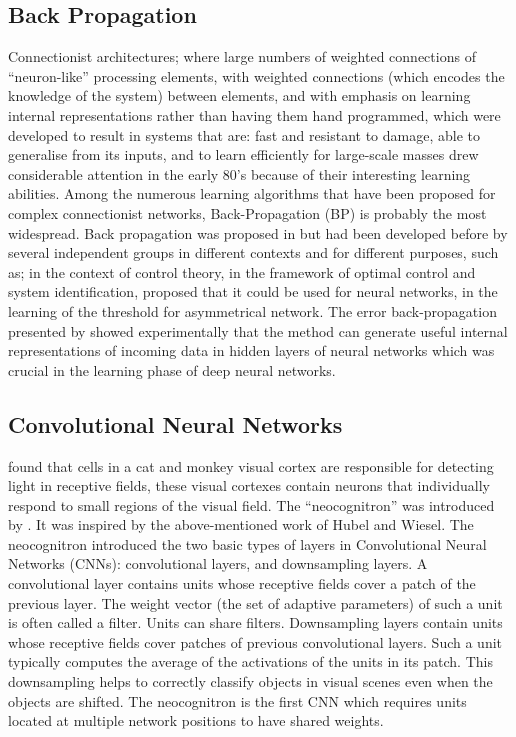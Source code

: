 \documentclass[12pt]{report}
\numberwithin{equation}{section}
\begin{document}
\subsection{Back Propagation}
Connectionist architectures; where large numbers of weighted connections of ``neuron-like'' processing elements, with weighted connections (which encodes the knowledge of the system) between elements, and with emphasis on learning internal representations rather than having them hand programmed, which were developed to result in systems that are: fast and resistant to damage, able to generalise from its inputs, and to learn efficiently for large-scale masses drew considerable attention in the early 80's because of their interesting learning abilities. Among the numerous learning algorithms that have been proposed for complex connectionist networks, Back-Propagation (BP) is probably the most widespread. Back propagation was proposed in {\cite{RumelhartHintonWilliams86}} but had been developed before by several independent groups in different contexts and for different purposes, such as; {\cite{Kelley:1960}} in the context of control theory, {\cite{BrysonHo69}} in the framework of optimal control and system identification, {\cite{Werbos:74}} proposed that it could be used for neural networks, {\cite{7fa6b6a5cde14bcfbd7ab3a8f19d0d56}} in the learning of the threshold for asymmetrical network. The error back-propagation presented by {\cite{RumelhartHintonWilliams86}} showed experimentally that the method can generate useful internal representations of incoming data in hidden layers of neural networks which was crucial in the learning phase of deep neural networks.

\subsection{Convolutional Neural Networks}
{\cite{Hubel:62}} found that cells in a cat and monkey visual cortex are responsible for detecting light in receptive fields, these visual cortexes contain neurons that individually respond to small regions of the visual field. The ``neocognitron'' was introduced by {\cite{fukushima:neocognitronbc}}. It was inspired by the above-mentioned work of Hubel and Wiesel. The neocognitron introduced the two basic types of layers in Convolutional Neural Networks (CNNs): convolutional layers, and downsampling layers. A convolutional layer contains units whose receptive fields cover a patch of the previous layer. The weight vector (the set of adaptive parameters) of such a unit is often called a filter. Units can share filters. Downsampling layers contain units whose receptive fields cover patches of previous convolutional layers. Such a unit typically computes the average of the activations of the units in its patch. This downsampling helps to correctly classify objects in visual scenes even when the objects are shifted. The neocognitron is the first CNN which requires units located at multiple network positions to have shared weights. 
\end{document}
